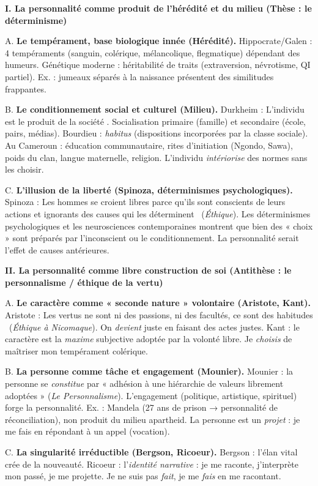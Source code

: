\documentclass[11pt]{article}
\begin{document}
\begin{corrige}
\textbf{I. La personnalité comme produit de l'hérédité et du milieu (Thèse : le déterminisme)}
\par A. \textbf{Le tempérament, base biologique innée (Hérédité).} Hippocrate/Galen : 4 tempéraments (sanguin, colérique, mélancolique, flegmatique) dépendant des humeurs. Génétique moderne : héritabilité de traits (extraversion, névrotisme, QI partiel). Ex. : jumeaux séparés à la naissance présentent des similitudes frappantes.
\par B. \textbf{Le conditionnement social et culturel (Milieu).} Durkheim : \guillemotleft L'individu est le produit de la société \guillemotright. Socialisation primaire (famille) et secondaire (école, pairs, médias). Bourdieu : \emph{habitus} (dispositions incorporées par la classe sociale). Au Cameroun : éducation communautaire, rites d'initiation (Ngondo, Sawa), poids du clan, langue maternelle, religion. L'individu \emph{intériorise} des normes sans les choisir.
\par C. \textbf{L'illusion de la liberté (Spinoza, déterminismes psychologiques).} Spinoza : \guillemotleft Les hommes se croient libres parce qu'ils sont conscients de leurs actions et ignorants des causes qui les déterminent \guillemotright\ (\emph{Éthique}). Les déterminismes psychologiques et les neurosciences contemporaines montrent que bien des « choix » sont préparés par l'inconscient ou le conditionnement. La personnalité serait l'effet de causes antérieures.

\textbf{II. La personnalité comme libre construction de soi (Antithèse : le personnalisme / éthique de la vertu)}
\par A. \textbf{Le caractère comme « seconde nature » volontaire (Aristote, Kant).} Aristote : \guillemotleft Les vertus ne sont ni des passions, ni des facultés, ce sont des habitudes \guillemotright\ (\emph{Éthique à Nicomaque}). On \emph{devient} juste en faisant des actes justes. Kant : le caractère est la \emph{maxime} subjective adoptée par la volonté libre. Je \emph{choisis} de maîtriser mon tempérament colérique.
\par B. \textbf{La personne comme tâche et engagement (Mounier).} Mounier : la personne se \emph{constitue} par « adhésion à une hiérarchie de valeurs librement adoptées » (\emph{Le Personnalisme}). L'engagement (politique, artistique, spirituel) forge la personnalité. Ex. : Mandela (27 ans de prison → personnalité de réconciliation), non produit du milieu apartheid. La personne est un \emph{projet} : je me fais en répondant à un appel (vocation).
\par C. \textbf{La singularité irréductible (Bergson, Ricoeur).} Bergson : l'élan vital crée de la nouveauté. Ricoeur : l'\emph{identité narrative} : je me raconte, j'interprète mon passé, je me projette. Je ne suis pas \emph{fait}, je me \emph{fais} en me racontant.


\end{corrige}
\end{document}

